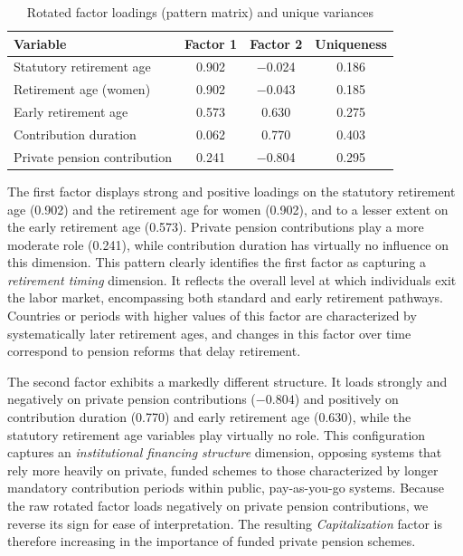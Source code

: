\documentclass[11pt,english,a4paper, twoside, authoryear]{article}
\begin{document}
\begin{table}[h!]
\centering
\caption{Rotated factor loadings (pattern matrix) and unique variances}
\label{tab:pcfa_loadings}
\begin{tabular}{lccc}
\hline\hline
Variable & Factor 1 & Factor 2 & Uniqueness \\
\hline
Statutory retirement age      &  0.902 & $-$0.024 & 0.186 \\
Retirement age (women)        &  0.902 & $-$0.043 & 0.185 \\
Early retirement age          &  0.573 &   0.630  & 0.275 \\
Contribution duration         &  0.062 &   0.770  & 0.403 \\
Private pension contribution  &  0.241 & $-$0.804 & 0.295 \\
\hline\hline
\end{tabular}
\end{table}

The first factor displays strong and positive loadings on the statutory retirement age (0.902) and the retirement age for women (0.902), and to a lesser extent on the early retirement age (0.573). Private pension contributions play a more moderate role (0.241), while contribution duration has virtually no influence on this dimension. This pattern clearly identifies the first factor as capturing a \emph{retirement timing} dimension. It reflects the overall level at which individuals exit the labor market, encompassing both standard and early retirement pathways. Countries or periods with higher values of this factor are characterized by systematically later retirement ages, and changes in this factor over time correspond to pension reforms that delay retirement.

The second factor exhibits a markedly different structure. It loads strongly and negatively on private pension contributions ($-0.804$) and positively on contribution duration (0.770) and early retirement age (0.630), while the statutory retirement age variables play virtually no role. This configuration captures an \emph{institutional financing structure} dimension, opposing systems that rely more heavily on private, funded schemes to those characterized by longer mandatory contribution periods within public, pay-as-you-go systems. Because the raw rotated factor loads negatively on private pension contributions, we reverse its sign for ease of interpretation. The resulting \emph{Capitalization} factor is therefore increasing in the importance of funded private pension schemes.
\end{document}
